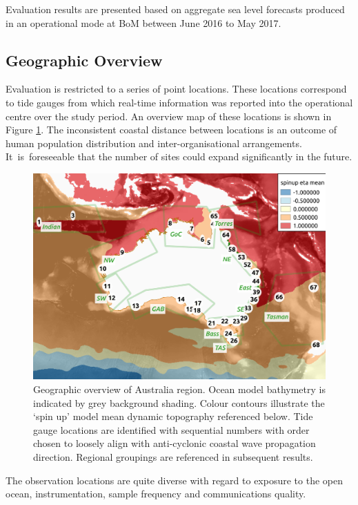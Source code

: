 Evaluation results are presented based on aggregate sea level forecasts produced in an operational mode at BoM between June 2016 to May 2017.

\subsection{Geographic Overview}
Evaluation is restricted to a series of point locations.  These locations correspond to tide gauges from which real-time information was reported into the operational centre over the study period.  An overview map of these locations is shown in Figure \ref{fig:map_locations}.
The inconsistent coastal distance between locations is an outcome of human population distribution and inter-organisational arrangements.
It~is~foreseeable that the number of sites could expand significantly in the future.
\vspace{6pt}
\begin{figure}[H]
    \centering
    \includegraphics[width=1.0\textwidth]{figures/maps/omaps_bathy_and_eta.png}
    \caption{Geographic overview of Australia region.  Ocean model bathymetry is indicated by grey background shading.  Colour contours illustrate the `spin up' model mean dynamic topography referenced below.  Tide gauge locations are identified with sequential numbers with order chosen to loosely align with anti-cyclonic coastal wave propagation direction. Regional groupings are referenced in subsequent results.}
    \label{fig:map_locations}
\end{figure}  

The observation locations are quite diverse with regard to exposure to the open ocean, instrumentation, sample frequency and communications quality. 


